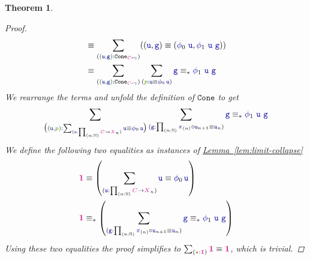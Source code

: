 \documentclass[twoside,11pt,openright]{report}
\theoremstyle{plain} %
\newtheorem{thm}{Theorem}[section]
\theoremstyle{definition}
\theoremstyle{remark}
\newcommand*{\lemref}[1]{\hyperref[lem:#1]{Lemma~\ref*{lem:#1}}}
\newcommand*{\term}[1]{\textcolor{green!30!black}{#1}} %
\newcommand*{\pathterm}[1]{\textcolor{green!65!red!75!black}{#1}}
\newcommand*{\type}[1]{\textcolor{magenta!90!black}{#1}}
\newcommand*{\unit}{\type{\textbf{1}}}
\newcommand*{\coalg}[2]{#1\texttt{-}#2}
\newcommand*{\constant}[1]{\textcolor{orange!60!black}{\ensuremath{\mathtt{#1}}}}
\newcommand*{\function}[1]{\textcolor{blue!60!black}{\ensuremath{\mathtt{#1}}}}
\newcommand*{\typeformer}[1]{\ensuremath{\mathtt{#1}}}
\newcommand*{\unitelem}{\constant{\star}} %
\begin{document}
\begin{thm}
\begin{proof}
\begin{align}
    &\equiv \sum_{(\term{(\function{u},\function{g})} : \typeformer{Cone}_{\coalg{\type{C}}{\function{\gamma}}})} ((\function{u},\function{g}) \equiv (\function{\phi}_0~\function{u},\function{\phi}_1~\function{u}~\function{g})) \\
    &\equiv \sum_{(\term{(\function{u},\function{g})} : \typeformer{Cone}_{\coalg{\type{C}}{\function{\gamma}}})} \sum_{(\pathterm{p} : \function{u} \equiv \function{\phi}_0\,\function{u})} \function{g} \equiv_{*} \function{\phi}_1~\function{u}~\function{g}
  \end{align}
  We rearrange the terms and unfold the definition of \(\typeformer{Cone}\) to get
  \begin{equation}
    \sum_{\big(\term{(\function{u},\pathterm{p})} : \sum_{(\function{u} : \prod_{(n:\mathbb{N})} \type{C} \rightarrow \type{X}_n)} \function{u} \equiv \function{\phi}_0\,\function{u}\big)} \sum_{(\function{g} : \prod_{(n:\mathbb{N})} \function{\pi}_{(n)} \circ \function{u}_{n+1} \equiv \function{u}_n)}\function{g} \equiv_{*} \function{\phi}_1~\function{u}~\function{g}
  \end{equation}
  We define the following two equalities as instances of \lemref{limit-collapse}
  \begin{align}
    \unit &\equiv \left(\sum_{(\function{u} : \prod_{(n:\mathbb{N})} \type{C} \rightarrow \type{X}_n)} \function{u} \equiv \function{\phi}_0\,\function{u}\right)  \\
    \unit &\equiv_{*} \left(\sum_{(\function{g} : \prod_{(n:\mathbb{N})} \function{\pi}_{(n)} \circ \function{u}_{n+1} \equiv \function{u}_n)}\function{g} \equiv_{*} \function{\phi}_1~\function{u}~\function{g}\right)
  \end{align}
  Using these two equalities the proof simplifies to \(\sum_{(\unitelem : \unit)} \unit \equiv \unit\), which is trivial.
  \end{proof}
\end{thm}
\end{document}

